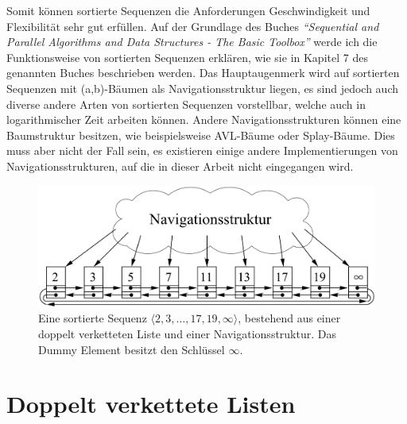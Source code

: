 \par
Somit können sortierte Sequenzen die Anforderungen Geschwindigkeit und Flexibilität sehr gut erfüllen. Auf der Grundlage des Buches \textit{"`Sequential and Parallel Algorithms and Data Structures - The Basic Toolbox"'} \cite{Sanders:19} werde ich die Funktionsweise von sortierten Sequenzen erklären, wie sie in Kapitel 7 des genannten Buches beschrieben werden. Das Hauptaugenmerk wird auf sortierten Sequenzen mit (a,b)-Bäumen als Navigationsstruktur liegen, es sind jedoch auch diverse andere Arten von sortierten Sequenzen vorstellbar, welche auch in logarithmischer Zeit arbeiten können. Andere Navigationsstrukturen können eine Baumstruktur besitzen, wie beispielsweise AVL-Bäume oder Splay-Bäume. Dies muss aber nicht der Fall sein, es existieren einige andere Implementierungen von Navigationsstrukturen, auf die in dieser Arbeit nicht eingegangen wird.

\begin{figure}
    \begin{center}
        \includegraphics[width=0.8\linewidth]{assets/NavStruct.png}
        \caption{Eine sortierte Sequenz $\langle2, 3, \dots, 17, 19, \infty \rangle$, bestehend aus einer doppelt verketteten Liste und einer Navigationsstruktur. Das Dummy Element besitzt den Schlüssel $\infty$.\\\cite{Sanders:19}}
        \label{fig:NavStruct}
    \end{center}
\end{figure}


\section{Doppelt verkettete Listen}
\label{section:dll}

